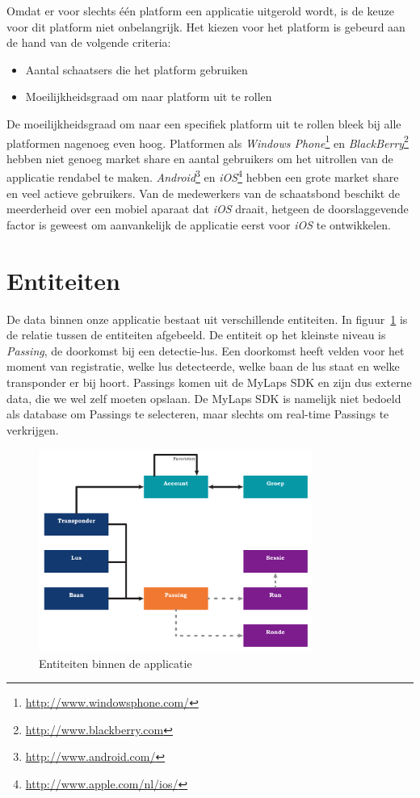 Omdat er voor slechts één platform een applicatie uitgerold wordt, is de keuze voor dit platform niet onbelangrijk. Het kiezen voor het platform is gebeurd aan de hand van de volgende criteria:
\begin{itemize}
\item Aantal schaatsers die het platform gebruiken
\item Moeilijkheidsgraad om naar platform uit te rollen
\end{itemize}

De moeilijkheidsgraad om naar een specifiek platform uit te rollen bleek bij alle platformen nagenoeg even hoog. Platformen als \textit{Windows Phone}\footnote{\url{http://www.windowsphone.com/}} en \textit{BlackBerry}\footnote{\url{http://www.blackberry.com}} hebben niet genoeg market share en aantal gebruikers om het uitrollen van de applicatie rendabel te maken. \textit{Android}\footnote{\url{http://www.android.com/}} en \textit{iOS}\footnote{\url{http://www.apple.com/nl/ios/}} hebben een grote market share en veel actieve gebruikers. Van de medewerkers van de schaatsbond beschikt de meerderheid over een mobiel aparaat dat \textit{iOS} draait, hetgeen de doorslaggevende factor is geweest om aanvankelijk de applicatie eerst voor \textit{iOS} te ontwikkelen.

\section{Entiteiten}
De data binnen onze applicatie bestaat uit verschillende entiteiten. In figuur~\ref{fig:entities} is de relatie tussen de entiteiten afgebeeld. De entiteit op het kleinste niveau is \textit{Passing}, de doorkomst bij een detectie-lus. Een doorkomst heeft velden voor het moment van registratie, welke lus detecteerde, welke baan de lus staat en welke transponder er bij hoort. Passings komen uit de MyLaps SDK en zijn dus externe data, die we wel zelf moeten opslaan. De MyLaps SDK is namelijk niet bedoeld als database om Passings te selecteren, maar slechts om real-time Passings te verkrijgen.

\begin{figure}
\centering
\includegraphics[width=0.8\textwidth]{style/images/Entiteiten}
\caption{Entiteiten binnen de applicatie}
\label{fig:entities}
\end{figure}


